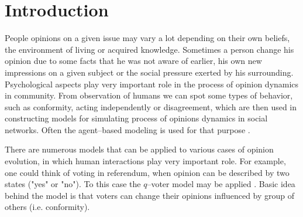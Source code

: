 \documentclass[a4paper, 12pt]{article}
\begin{document}

\newpage

\newpage



\tableofcontents

\newpage

\section{Introduction}


People opinions on a given issue may vary a lot depending on their own beliefs, the environment of living or acquired knowledge. Sometimes a person change his opinion due to some facts that he was not aware of earlier, his own new impressions on a given subject or the social pressure exerted by his surrounding. Psychological aspects play very important role in the process of opinion dynamics in community. From observation of humans we can spot some types of behavior, such as conformity, acting independently or disagreement, which are then used in constructing models for simulating process of opinions dynamics in social networks. Often the agent--based modeling is used for that purpose \cite{sp}.

There are numerous models that can be applied to various cases of opinion evolution, in which human interactions play very important role. For example, one could think of voting in referendum, when opinion can be described by two states ("yes" or "no"). To this case the $q$--voter model may be applied \cite{qv}. Basic idea behind the model is that voters can change their opinions influenced by group of others (i.e. conformity). 
\indent
\end{document}
